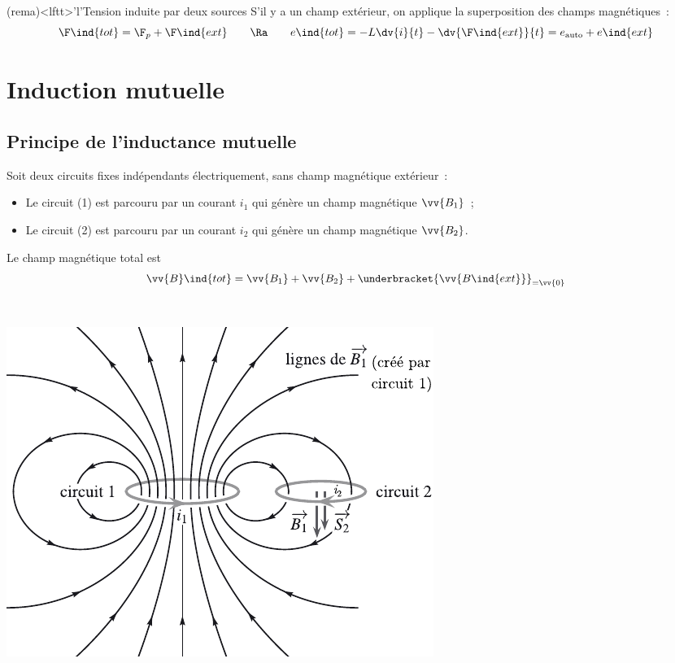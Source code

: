 \documentclass[../../main/main.tex]{subfiles}
\begin{document}
\begin{tcb}(rema)<lftt>'l'{Tension induite par deux sources}
	S'il y a un champ extérieur, on applique la superposition des champs
	magnétiques~:
	\[
		\F\ind{tot} = \F_p + \F\ind{ext}
		\qquad
		\Ra
		\qquad
		e\ind{tot} = -L \dv{i}{t} - \dv{\F\ind{ext}}{t} = e_{\rm auto} + e\ind{ext}
	\]
\end{tcb}

\section{Induction mutuelle}
\label{sec:inducmut}
\subsection{Principe de l'inductance mutuelle}
\label{ssec:prpeinducmut}
\noindent
Soit deux circuits fixes indépendants électriquement, sans champ magnétique
extérieur~:
\smallbreak
\noindent
\begin{minipage}[t]{.6\linewidth}
	\begin{itemize}
		\item Le circuit (1) est parcouru par un courant $i_1$ qui génère un champ
		      magnétique $\vv{B_1}$~;
		\item Le circuit (2) est parcouru par un courant $i_2$ qui génère un champ
		      magnétique $\vv{B_2}$.
	\end{itemize}
	Le champ magnétique total est
	\[
		\vv{B}\ind{tot} =
		\vv{B_1} + \vv{B_2} + \underbracket{\vv{B\ind{ext}}}_{=\vv{0}}
	\]
\end{minipage}
\hfill
\begin{minipage}[t]{.4\linewidth}
	~
	\vspace*{-20pt}
	\begin{center}
		\includegraphics[width=.8\linewidth]{inducmut}
		\label{fig:inducmut}
	\end{center}
\end{minipage}
\end{document}
